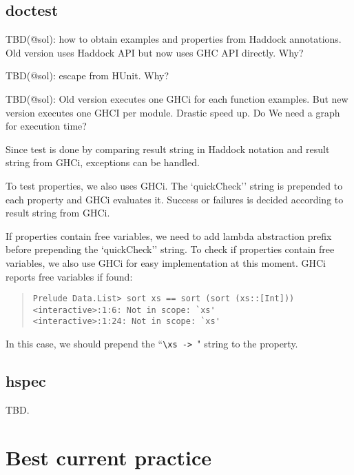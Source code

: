 \documentclass[preprint]{sigplanconf}
\begin{document}
\subsection{doctest}
\label{sec:doctest}

TBD(@sol): how to obtain examples and properties from Haddock annotations.
Old version uses Haddock API but now uses GHC API directly. Why?

TBD(@sol): escape from HUnit. Why?

TBD(@sol): Old version executes one GHCi for each function examples.
But new version executes one GHCI per module.
Drastic speed up. Do We need a graph for execution time?

Since test is done by comparing result string in Haddock notation
and result string from GHCi, exceptions can be handled.

To test properties, we also uses GHCi. 
The `quickCheck'' string is prepended to each property
and GHCi evaluates it.
Success or failures is decided according to result string from GHCi.

If properties contain free variables,
we need to add lambda abstraction prefix before prepending
the `quickCheck'' string.
To check if properties contain free variables, 
we also use GHCi for easy implementation at this moment.
GHCi reports free variables if found:

\begin{quote}
\small
\begin{verbatim}
Prelude Data.List> sort xs == sort (sort (xs::[Int]))
<interactive>:1:6: Not in scope: `xs'
<interactive>:1:24: Not in scope: `xs'
\end{verbatim}
\end{quote}

\noindent In this case, we should prepend the ``\verb|\xs -> |" string
to the property.

\subsection{hspec}
\label{sec:hspec}

TBD.

\section{Best current practice}
\label{ref:Best-current-practice}
\end{document}
